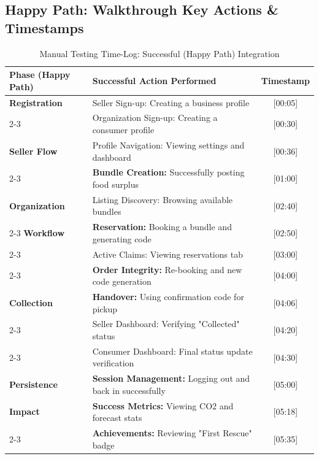 \documentclass[12pt,a4paper]{article}
\begin{document}
\subsection*{Happy Path: Walkthrough Key Actions \& Timestamps}
\begin{table}[H]
    \centering
    \small
    \renewcommand{\arraystretch}{1.2}
    \begin{tabular}{|l|p{8cm}|c|}
        \hline
        \rowcolor{gray!10} \textbf{Phase (Happy Path)} & \textbf{Successful Action Performed} & \textbf{Timestamp} \\ \hline
        \textbf{Registration} & Seller Sign-up: Creating a business profile & [00:05] \\ \cline{2-3}
        & Organization Sign-up: Creating a consumer profile & [00:30] \\ \hline
        \textbf{Seller Flow} & Profile Navigation: Viewing settings and dashboard & [00:36] \\ \cline{2-3}
        & \textbf{Bundle Creation:} Successfully posting food surplus & [01:00] \\ \hline
        \textbf{Organization} & Listing Discovery: Browsing available bundles & [02:40] \\ \cline{2-3}
        \textbf{Workflow} & \textbf{Reservation:} Booking a bundle and generating code & [02:50] \\ \cline{2-3}
        & Active Claims: Viewing reservations tab & [03:00] \\ \cline{2-3}
        & \textbf{Order Integrity:} Re-booking and new code generation & [04:00] \\ \hline
        \textbf{Collection} & \textbf{Handover:} Using confirmation code for pickup & [04:06] \\ \cline{2-3}
        & Seller Dashboard: Verifying "Collected" status & [04:20] \\ \cline{2-3}
        & Consumer Dashboard: Final status update verification & [04:30] \\ \hline
        \textbf{Persistence} & \textbf{Session Management:} Logging out and back in successfully & [05:00] \\ \hline
        \textbf{Impact} & \textbf{Success Metrics:} Viewing CO2 and forecast stats & [05:18] \\ \cline{2-3}
        & \textbf{Achievements:} Reviewing "First Rescue" badge & [05:35] \\ \hline
    \end{tabular}
    \caption{Manual Testing Time-Log: Successful (Happy Path) Integration}
\end{table}
\end{document}
